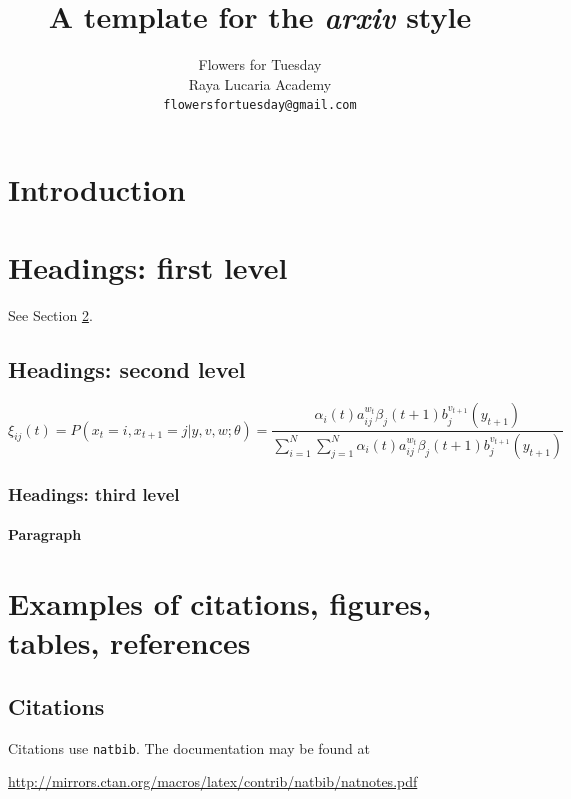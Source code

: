 \documentclass{article}
\title{A template for the \emph{arxiv} style}
\author{%
	Flowers for Tuesday \\
	Raya Lucaria Academy\\
	\texttt{flowersfortuesday@gmail.com} \\
}
\begin{document}
\makecover %
\maketitle

\begin{abstract}
	\lipsum[1]
\end{abstract}




\section{Introduction}
\lipsum[2]
\lipsum[3]


\section{Headings: first level}
\label{sec:headings}

\lipsum[4] See Section \ref{sec:headings}.

\subsection{Headings: second level}
\lipsum[5]
\begin{equation}
	\xi _{ij}(t)=P(x_{t}=i,x_{t+1}=j|y,v,w;\theta)= {\frac {\alpha _{i}(t)a^{w_t}_{ij}\beta _{j}(t+1)b^{v_{t+1}}_{j}(y_{t+1})}{\sum _{i=1}^{N} \sum _{j=1}^{N} \alpha _{i}(t)a^{w_t}_{ij}\beta _{j}(t+1)b^{v_{t+1}}_{j}(y_{t+1})}}
\end{equation}

\subsubsection{Headings: third level}
\lipsum[6]

\paragraph{Paragraph}
\lipsum[7]



\section{Examples of citations, figures, tables, references}
\label{sec:others}

\subsection{Citations}
Citations use \verb+natbib+. The documentation may be found at
\begin{center}
	\url{http://mirrors.ctan.org/macros/latex/contrib/natbib/natnotes.pdf}
\end{center}
\end{document}
